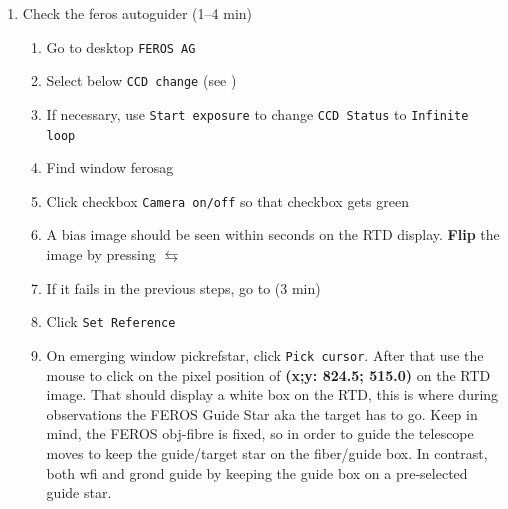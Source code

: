 \documentclass[11pt,fleqn,a4paper]{book}
\makeatletter
\def\menu#1#2{\texttt{#1}\ifx{}#2\else\@for\@x:=#2\do{$\rightarrow$\texttt{\@x}}\fi}
\def\wmenu#1#2{window menu \menu{#1}{#2}}
\makeatother
\begin{document}
\begin{enumerate}
\begin{enumerate}
\begin{enumerate}
                  \item If necessary, use \texttt{Start exposure} to change \texttt{CCD Status} to \texttt{Infinite loop}
                  \item Find window \gls{grondag}
                  \item Use \wmenu{TCS}{Attach camera}
                  \item A bias image should be seen within seconds
                  \item If it fails in the previous steps, go to  (3 min)
                  \item Use \wmenu{TCS}{Pick Reference Star}
                  \item On emerging window \gls{pickrefstar}, click \texttt{Cancel operation}
               \end{enumerate}
           \item Check the \gls{feros} autoguider (1--4 min)
               \begin{enumerate}
                  \item Go to \gls{desktop} \texttt{FEROS AG}
                  \item Select  below \texttt{CCD change} (see )
                  \item If necessary, use \texttt{Start exposure} to change \texttt{CCD Status} to \texttt{Infinite loop}
                  \item Find window \gls{ferosag}
                  \item Click checkbox \texttt{Camera on/off} so that checkbox gets green
                  \item A bias image should be seen within seconds on the RTD display. {\bf{Flip}} the image by pressing {$\leftrightarrows$}
                  \item If it fails in the previous steps, go to  (3 min)
                  \item Click \texttt{Set Reference}
                  \item On emerging window \gls{pickrefstar}, click \texttt{Pick cursor}. After that use the mouse to click on the pixel position of {\bf{(x;y: 824.5; 515.0)}} on the RTD image. That should display a white box on the RTD, this is where during observations the FEROS Guide Star aka the target has to go. Keep in mind, the FEROS obj-fibre is fixed, so in order to guide the telescope moves to keep the guide/target star on the fiber/guide box. In contrast, both \gls{wfi} and \gls{grond}  guide by keeping the guide box on a pre-selected guide star.

\end{enumerate}
\end{enumerate}
\end{enumerate}
\end{document}
